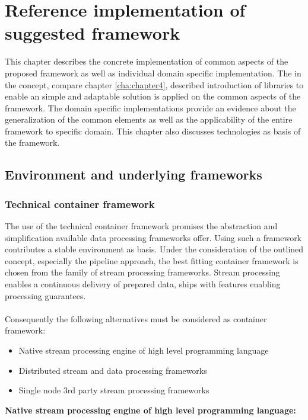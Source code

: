 \chapter{Reference implementation of suggested framework\label{cha:chapter5}}

This chapter describes the concrete implementation of common aspects of the proposed framework as well as individual domain specific implementation. The in the concept, compare chapter \ref{cha:chapter4}, described introduction of libraries to enable an simple and adaptable solution is applied on the common aspects of the framework. The domain specific implementations provide an evidence about the generalization of the common elements as well as the applicability of the entire framework to specific domain. This chapter also discusses technologies as basis of the framework. 

\section{Environment and underlying frameworks\label{sec:env}}

\subsection{Technical container framework}

The use of the technical container framework promises the abstraction and simplification available data processing frameworks offer. Using such a framework contributes a stable environment as basis. Under the consideration of the outlined concept, especially the pipeline approach, the best fitting container framework is chosen from the family of stream processing frameworks. Stream processing enables a continuous delivery of prepared data, ships with features enabling processing guarantees.
\\\\
Consequently the following alternatives must be considered as container framework:
\begin{itemize}
\item Native stream processing engine of high level programming language
\item Distributed stream and data processing frameworks
\item Single node 3rd party stream processing frameworks\\
\end{itemize}

\noindent\textbf{Native stream processing engine of high level programming language:}

